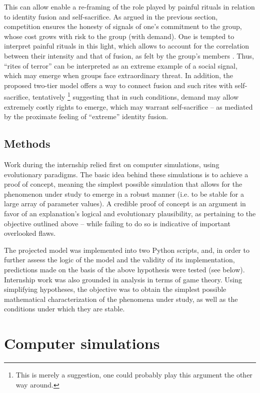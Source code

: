 \documentclass[a4paper,12pt]{report}
\begin{document}
This can allow enable a re-framing of the role played by painful rituals in
relation to identity fusion and self-sacrifice. As argued in the previous section,
 competition ensures the honesty of signals of one’s commitment to the group, whose
 cost grows with risk to the group (with demand). One is tempted to interpret painful
 rituals in this light, which allows to account for the correlation between their
 intensity and that of fusion, as felt by the group’s members \cite{whitehouse_dying_2018}.
 Thus, “rites of terror” \cite{whitehouse_rites_1996} can be interpreted as an extreme
 example of a social signal, which may emerge when groups face extraordinary threat.
 In addition, the proposed two-tier model offers a way to connect fusion and such rites
 with self-sacrifice, tentatively
 \footnote{This is merely a suggestion, one could probably play this argument
  the other way around.}
 suggesting that in such conditions, demand may allow
 extremely costly rights to emerge, which may warrant self-sacrifice – as mediated by
 the proximate feeling of “extreme” identity fusion.

\subsection{Methods}
Work during the internship relied first on computer simulations,
using evolutionary paradigms. The basic idea behind these simulations
is to achieve a proof of concept, meaning the simplest possible simulation
that allows for the phenomenon under study to emerge in a robust manner
(i.e. to be stable for a large array of parameter values). A credible
proof of concept is an argument in favor of an explanation’s logical
and evolutionary plausibility, as pertaining to the objective outlined above
– while failing to do so is indicative of important overlooked flaws.

The projected model was implemented into two Python scripts,
and, in order to further assess the logic of the model and the validity
of its implementation, predictions made on the basis of the above hypothesis
were tested (see below).
Internship work was also grounded in analysis in terms of game theory.
Using simplifying hypotheses, the objective was to obtain the simplest
possible mathematical characterization of the phenomena under study,
as well as the conditions under which they are stable.

\section{Computer simulations}
\end{document}
